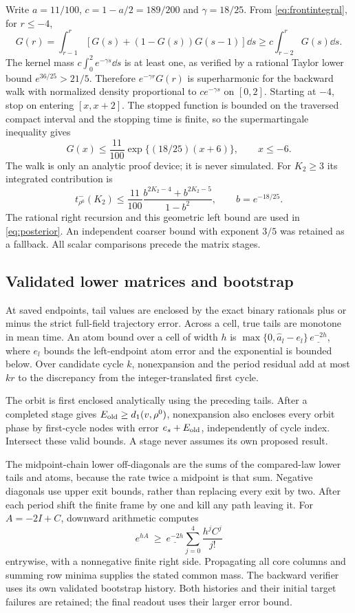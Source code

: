 Write $a=11/100$, $c=1-a/2=189/200$ and $\gamma=18/25$. From \eqref{eq:frontintegral}, for $r\le-4$,
\[
 G(r)=\int_{r-1}^r[G(s)+(1-G(s))G(s-1)]\dd s
 \ge c\int_{r-2}^rG(s)\dd s.
\]
The kernel mass $c\int_0^2e^{-\gamma s}\dd s$ is at least one, as verified by a rational Taylor lower bound $e^{36/25}>21/5$. Therefore $e^{-\gamma r}G(r)$ is superharmonic for the backward walk with normalized density proportional to $ce^{-\gamma s}$ on $[0,2]$. Starting at $-4$, stop on entering $[x,x+2]$. The stopped function is bounded on the traversed compact interval and the stopping time is finite, so the supermartingale inequality gives
\[
 G(x)\le\frac{11}{100}\exp\{(18/25)(x+6)\},\qquad x\le-6.
\]
The walk is only an analytic proof device; it is never simulated. For $K_2\ge3$ its integrated contribution is
\[
 t^-_{\rho^0}(K_2)\le\frac{11}{100}
 \frac{b^{2K_2-4}+b^{2K_2-5}}{1-b^2},\qquad b=e^{-18/25}.
\]
The rational right recursion and this geometric left bound are used in \eqref{eq:posterior}. An independent coarser bound with exponent $3/5$ was retained as a fallback. All scalar comparisons precede the matrix stages.

\subsection{Validated lower matrices and bootstrap}
At saved endpoints, tail values are enclosed by the exact binary rationals plus
or minus the strict full-field trajectory error. Across a cell, true tails
are monotone in mean time. An atom bound over a cell of width $h$ is
$\max\{0,\widehat a_l-e_l\}\,\underline{e^{-2h}}$, where $e_l$ bounds the
left-endpoint atom error and the exponential is bounded below.
Over candidate cycle $k$, nonexpansion and the period residual add at most
$kr$ to the discrepancy from the integer-translated first cycle.

The orbit is first enclosed analytically using the preceding tails. After a completed stage gives $E_{\rm old}\ge d_1(v,\rho^0)$, nonexpansion also encloses every orbit phase by first-cycle nodes with error $e_s+E_{\rm old}$, independently of cycle index. Intersect these valid bounds. A stage never assumes its own proposed result.

The midpoint-chain lower off-diagonals are the sums of the compared-law lower tails and atoms, because the rate twice a midpoint is that sum. Negative diagonals use upper exit bounds, rather than replacing every exit by two. After each period shift the finite frame by one and kill any path leaving it. For $A=-2I+C$, downward arithmetic computes
\[
 e^{hA}\ \ge\ \underline{e^{-2h}}\sum_{j=0}^4\frac{h^jC^j}{j!}
\]
entrywise, with a nonnegative finite right side. Propagating all core columns and summing row minima supplies the stated common mass. The backward verifier uses its own validated bootstrap history. Both histories and their initial target failures are retained; the final readout uses their larger error bound.

